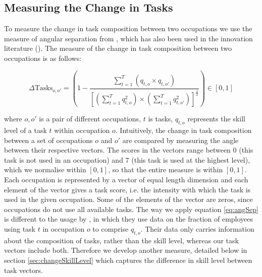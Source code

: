 \documentclass[11pt, oneside]{article}
\begin{document}
	\subsection{Measuring the Change in Tasks}
	\label{sec:taskDistance}
	To measure the change in task composition between two occupations we use the measure of angular separation from \cite{Gathmann2010}, which has also been used in the innovation literature (\cite{Jaffe1986}). The measure of the change in task composition between two occupations is as follows:
	
	
	\begin{equation}
	\label{eq:angSep}
	\Delta \text{Tasks}_{o,o'} = \left(1 - \frac{\sum_{t=1}^{T}(q_{t,o}\times q_{t,o'})}{\left[(\sum_{t=1}^{T}q_{t,o}^{2})\times(\sum_{t=1}^{T}q_{t,o'}^{2})\right]^{\frac{1}{2}}}\right)   \in [0,1]
	\end{equation}
	
	\noindent where $o,o'$ is a pair of different occupations, $t$ is tasks, $q_{t,o}$ represents the skill level of a task $t$ within occupation $o$. Intuitively, the change in task composition between a set of occupations $o$ and $o'$ are compared by measuring the angle between their respective vectors. The scores in the vectors range between 0 (this task is not used in an occupation) and 7 (this task is used at the highest level), which we normalise within $[0,1]$, so that the entire measure is within $[0,1]$. Each occupation is represented by a vector of equal length dimension and each element of the vector gives a task score, i.e. the intensity with which the task is used in the given occupation. Some of the elements of the vector are zeros, since occupations do not use all available tasks. 
	The way we apply equation \ref{eq:angSep} is different to the usage by \cite{Gathmann2010}, in which they use data on the fraction of employees using task $t$ in occupation $o$ to comprise $q_{t,o}$. Their data only carries information about the composition of tasks, rather than the skill level, whereas our task vectors include both. Therefore we develop another measure, detailed below in section \ref{sec:changeSkillLevel} which captures the difference in skill level between task vectors.
	
	
	
\end{document}

